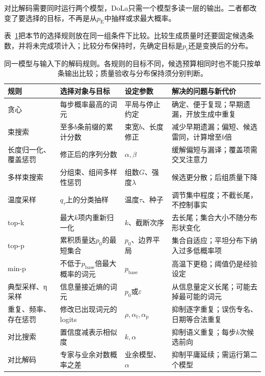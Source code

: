 对比解码需要同时运行两个模型，DoLa只需一个模型多读一层的输出。二者都改变了要选择的目标，不再是从$p_{\mathrm E}$中抽样或求最大概率。

表~\ref{tab:nlp-inference-decoding-rules}把本节的选择规则放在同一组条件下比较。比较生成质量时还要固定候选条数，并将未完成项计入；比较分布保持时，先确定目标是$p_t$还是变换后的分布。

\begin{table}[htbp]
 \small
 \begin{tabularx}{\linewidth}{@{}p{22mm}p{38mm}p{38mm}X@{}}
  \toprule
  规则 & 选择对象与目标 & 设定参数 & 解决的问题与新代价\\
  \midrule
  贪心 & 每步概率最高的词元 & 平局与停止约定 & 确定、便于复现；早期遗漏，开放生成中重复\\
  束搜索 & 至多$b$条前缀的累计分数 & 束宽$b$、长度修正 & 减少早期遗漏；偏短、候选雷同，计算增至$b$倍\\
  长度归一化、覆盖惩罚 & 修正后的序列分数 & $\alpha,\beta$ & 缓解偏短与漏译；覆盖项需交叉注意力\\
  多样束搜索 & 分组束、组间多样性惩罚 & 组数$G$、强度$\lambda$ & 候选更分散；后组质量下降\\
  温度采样 & $q_\tau$上的分类抽样 & 温度$\tau$、种子 & 调节集中程度；不截长尾，不控制事实\\
  top-k & 最大$k$项内重新归一化 & $k$、截断次序 & 去长尾；集合大小不随分布形状变化\\
  top-p & 累积质量达$p_0$的最短集合 & $p_0$、边界平局 & 集合自适应；平坦分布下纳入过多低概率项\\
  min-p & 不低于$p_{\mathrm{base}}$倍最大概率的词元 & $p_{\mathrm{base}}$ & 高温下更稳；阈值仍是经验设定\\
  典型采样、η采样 & 信息量接近熵的词元 & $p_0$或$\varepsilon$ & 从信息量定义长尾；可能去掉最可能的词元\\
  重复、频率、存在惩罚 & 修改已出现词元的logits & $\rho,\alpha_{\mathrm f},\alpha_{\mathrm p}$ & 抑制逐字重复；误伤专名、日期等合法重复\\
  对比搜索 & 置信度减表示相似度 & $k,\alpha$ & 抑制语义重复；每步$k$次候选前向\\
  对比解码 & 专家与业余对数概率之差 & 业余模型、$\alpha$ & 抑制平庸延续；需运行第二个模型\\
  \bottomrule
 \end{tabularx}
 \caption{同一模型与输入下的解码规则。各规则的目标不同，候选预算相同时也不能只按单条输出比较；质量验收与分布保持须分别判断。}
 \label{tab:nlp-inference-decoding-rules}
\end{table}

